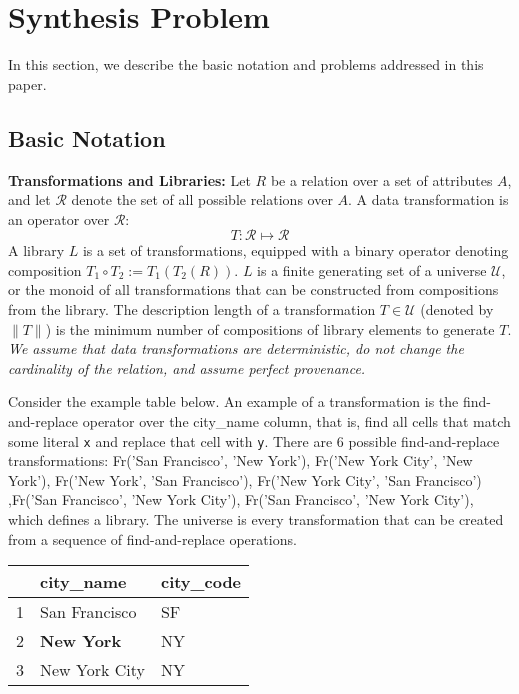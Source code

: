 \section{Synthesis Problem}
In this section, we describe the basic notation and problems addressed in this paper.

\subsection{Basic Notation}

\vspace{0.5em} \noindent \textbf{Transformations and Libraries: }
Let $R$ be a relation over a set of attributes $A$, and let $\mathcal{R}$ denote the set of all possible relations over $A$.
A data transformation is an operator over $\mathcal{R}$: 
\[T: \mathcal{R} \mapsto  \mathcal{R}\]
A library $L$ is a set of transformations, equipped with a binary operator denoting composition $T_1 \circ T_2 := T_1(T_2(R))$.
$L$ is a finite generating set of a universe $\mathcal{U}$, or the monoid of all transformations that can be constructed from compositions from the library.
The description length of a transformation $T \in \mathcal{U}$ (denoted by $\|T\|$) is the minimum number of compositions of library elements to generate $T$. 
\emph{We assume that data transformations are deterministic, do not change the cardinality of the relation, and assume perfect provenance.}

\begin{example}
Consider the example table below. An example of a transformation is the find-and-replace operator over the \textsf{city\_name} column, that is, find all cells that match some literal \texttt{x} and replace that cell with \texttt{y}. There are 6 possible find-and-replace transformations: Fr('San Francisco', 'New York'), Fr('New York City', 'New York'), Fr('New York', 'San Francisco'), Fr('New York City', 'San Francisco') ,Fr('San Francisco', 'New York City'), Fr('San Francisco', 'New York City'), which defines a library. The universe is every transformation that can be created from a sequence of find-and-replace operations.
\end{example}

\begin{table}[ht!]
\centering
\label{my-label}
\begin{tabular}{|l|l|l|}
\hline
\rowcolor[HTML]{000000} 
& {\color[HTML]{FFFFFF} city\_name}            & {\color[HTML]{FFFFFF} city\_code}   \\ \hline
1 & San Francisco                                & SF                                  \\ \hline
2& {\color[HTML]{FE0000} \textbf{New York}}     & NY                                  \\ \hline
3 & New York City                                & NY \\
\hline
\end{tabular}
\end{table}

